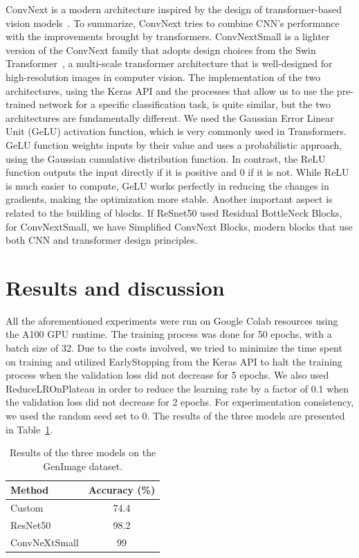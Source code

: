 \documentclass[runningheads]{llncs}
\begin{document}
ConvNext is a modern architecture inspired by the design of transformer-based vision models~\cite{liu2022convnet}. To summarize, ConvNext tries to combine CNN's performance with the improvements brought by transformers. ConvNextSmall is a lighter version of the ConvNext family that adopts design choices from the Swin Transformer~\cite{liu2021swin}, a multi-scale transformer architecture that is well-designed for high-resolution images in computer vision. The implementation of the two architectures, using the Keras API and the processes that allow us to use the pre-trained network for a specific classification task,  is quite similar, but the two architectures are fundamentally different. We used the Gaussian Error Linear Unit (GeLU) activation function, which is very commonly used in Transformers. GeLU function weights inputs by their value and uses a probabilistic approach, using the Gaussian cumulative distribution function. In contrast, the ReLU function outputs the input directly if it is positive and 0 if it is not. While ReLU is much easier to compute, GeLU works perfectly in reducing the changes in gradients, making the optimization more stable. Another important aspect is related to the building of blocks. If ReSnet50 used Residual BottleNeck Blocks, for ConvNextSmall, we have Simplified ConvNext Blocks, modern blocks that use both CNN and transformer design principles.

%
%
\section{Results and discussion}
All the aforementioned experiments were run on Google Colab resources using the A100 GPU runtime. The training process was done for 50 epochs, with a batch size of 32. Due to the costs involved, we tried to minimize the time spent on training and utilized EarlyStopping from the Keras API to halt the training process when the validation loss did not decrease for 5 epochs. We also used ReduceLROnPlateau in order to reduce the learning rate by a factor of 0.1 when the validation loss did not decrease for 2 epochs. For experimentation consistency, we used the random seed set to 0. The results of the three models are presented in Table~\ref{tab:simpleresults}.

\begin{table}
    \centering
    \caption{Results of the three models on the GenImage dataset.}\label{tab1}
    \begin{tabular}{l|c}
    \hline
    Method & Accuracy (\%) \\
    \hline
    Custom &  74.4 \\
    ResNet50 & 98.2 \\
    ConvNeXtSmall & 99 \\
    \hline
    \end{tabular}
    \label{tab:simpleresults}
\end{table}
\end{document}
